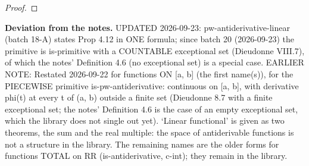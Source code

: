 \begin{proof}
%
%
%
%
%
%
%
%
%
%
\end{proof}
%
\noindent\textbf{Deviation from the notes.} UPDATED 2026-09-23: pw-antiderivative-linear (batch 18-A) states Prop 4.12 in ONE formula; since batch 20 (2026-09-23) the primitive is is-primitive with a COUNTABLE exceptional set (Dieudonne VIII.7), of which the notes' Definition 4.6 (no exceptional set) is a special case. EARLIER NOTE: Restated 2026-09-22 for functions ON [a, b] (the first name(s)), for the PIECEWISE primitive is-pw-antiderivative: continuous on [a, b], with derivative phi(t) at every t of (a, b) outside a finite set (Dieudonne 8.7 with a finite exceptional set; the notes' Definition 4.6 is the case of an empty exceptional set, which the library does not single out yet). `Linear functional' is given as two theorems, the sum and the real multiple: the space of antiderivable functions is not a structure in the library. The remaining names are the older forms for functions TOTAL on RR (is-antiderivative, c-int); they remain in the library.
%
\renewcommand{\thethm}{4.13}
